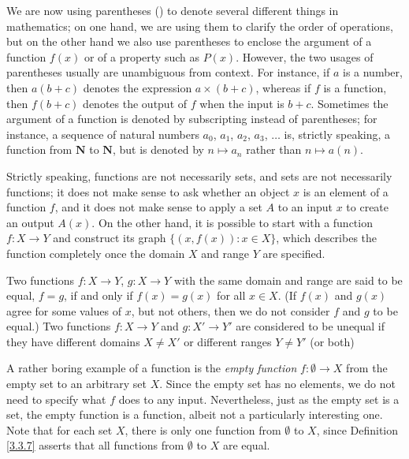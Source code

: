 \setcounter{theorem}{4}
\begin{remark}\label{3.3.5}
We are now using parentheses () to denote several different things in mathematics;
on one hand, we are using them to clarify the order of operations, but on the other hand we also use parentheses to enclose the argument of a function \(f(x)\) or of a property such as \(P(x)\).
However, the two usages of parentheses usually are unambiguous from context.
For instance, if \(a\) is a number, then \(a(b + c)\) denotes the expression \(a \times (b + c)\), whereas if \(f\) is a function, then \(f(b + c)\) denotes the output of \(f\) when the input is \(b + c\).
Sometimes the argument of a function is denoted by subscripting instead of parentheses;
for instance, a sequence of natural numbers \(a_0\), \(a_1\), \(a_2\), \(a_3\), \(\dots\) is, strictly speaking, a function from \(\mathbf{N}\) to \(\mathbf{N}\), but is denoted by \(n \mapsto a_n\) rather than \(n \mapsto a(n)\).
\end{remark}

\begin{remark}\label{3.3.6}
Strictly speaking, functions are not necessarily sets, and sets are not necessarily functions;
it does not make sense to ask whether an object \(x\) is an element of a function \(f\), and it does not make sense to apply a set \(A\) to an input \(x\) to create an output \(A(x)\).
On the other hand, it is possible to start with a function \(f : X \to Y\) and construct its graph \(\{(x, f(x)) : x \in X\}\), which describes the function completely once the domain \(X\) and range \(Y\) are specified.
\end{remark}

\begin{definition}\label{3.3.7}
Two functions \(f : X \to Y\), \(g : X \to Y\) with the same domain and range are said to be equal, \(f = g\), if and only if \(f(x) = g(x)\) for all \(x \in X\).
(If \(f(x)\) and \(g(x)\) agree for some values of \(x\), but not others, then we do not consider \(f\) and \(g\) to be equal.)
Two functions \(f : X \to Y\) and \(g : X' \to Y'\) are considered to be unequal if they have different domains \(X \neq X'\) or different ranges \(Y \neq Y'\) (or both)
\end{definition}

\begin{note}
A rather boring example of a function is the \emph{empty function} \(f : \emptyset \to X\) from the empty set to an arbitrary set \(X\).
Since the empty set has no elements, we do not need to specify what \(f\) does to any input.
Nevertheless, just as the empty set is a set, the empty function is a function, albeit not a particularly interesting one.
Note that for each set \(X\), there is only one function from \(\emptyset\) to \(X\), since Definition \ref{3.3.7} asserts that all functions from \(\emptyset\) to \(X\) are equal.
\end{note}

